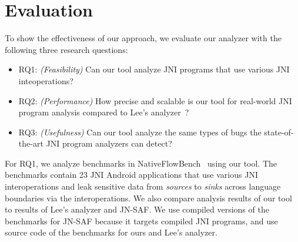 \newcommand{\req}[1]{RQ#1}

\section{Evaluation}\label{sec:eval}

%
%

To show the effectiveness of our approach, we evaluate our analyzer with the
following three research questions:
\begin{itemize}
  \item \req{1}: {\it (Feasibility)} Can our tool analyze JNI programs that use
    various JNI inteoperations?

  \item \req{2}: {\it (Performance)} How precise and scalable is our tool for
    real-world JNI program analysis compared to Lee's analyzer~\cite{LeeASE20}?

  \item \req{3}: {\it (Usefulness)} Can our tool analyze the same types of bugs
    the state-of-the-art JNI program analyzers can detect?
\end{itemize}


For \req{1}, we analyze benchmarks in NativeFlowBench~\cite{nativeflowbench,
JN-SAF} using our tool. The benchmarks contain 23 JNI Android applications that
use various JNI interoperations and leak sensitive data from {\it sources} to
{\it sinks} across language boundaries via the interoperations. We also compare
analysis results of our tool to results of Lee's analyzer and JN-SAF. We use
compiled versions of the benchmarks for JN-SAF because it targets compiled JNI
programs, and use source code of the benchmarks for ours and Lee's analyzer.

